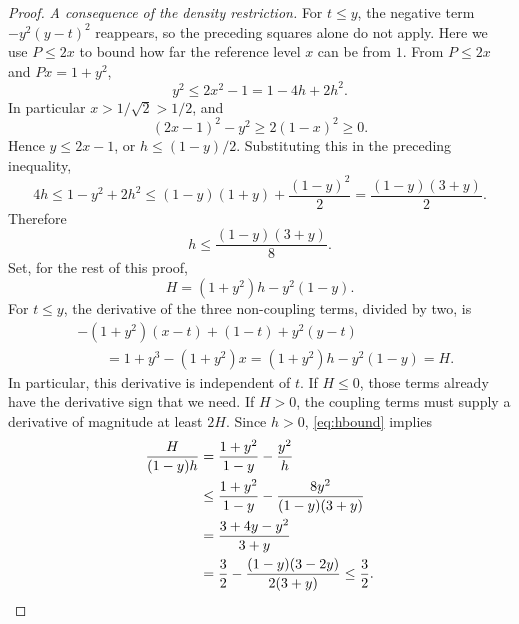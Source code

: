 \documentclass[11pt]{article}
\numberwithin{equation}{section}
\begin{document}
\begin{proof}
\smallskip
\noindent\emph{A consequence of the density restriction.}
For $t\le y$, the negative term $-y^2(y-t)^2$ reappears, so the
preceding squares alone do not apply. Here we use $P\le2x$ to
bound how far the reference level $x$ can be from $1$.
From $P\le2x$ and $Px=1+y^2$,
\[
 y^2\le2x^2-1=1-4h+2h^2.
\]
In particular $x>1/\sqrt2>1/2$, and
\[
 (2x-1)^2-y^2\ge2(1-x)^2\ge0.
\]
Hence $y\le2x-1$, or $h\le(1-y)/2$. Substituting this in the preceding inequality,
\[
 4h\le1-y^2+2h^2
 \le(1-y)(1+y)+\frac{(1-y)^2}{2}
 =\frac{(1-y)(3+y)}2.
\]
Therefore
\begin{equation}\label{eq:hbound}
 h\le\frac{(1-y)(3+y)}8.
\end{equation}
Set, for the rest of this proof,
\[
 H=(1+y^2)h-y^2(1-y).
\]
For $t\le y$, the derivative of the three non-coupling terms,
divided by two, is
\begin{align*}
 &-(1+y^2)(x-t)+(1-t)+y^2(y-t)\\
 &\qquad=1+y^3-(1+y^2)x
   =(1+y^2)h-y^2(1-y)=H.
\end{align*}
In particular, this derivative is independent of $t$.
If $H\le0$, those terms already
have the derivative sign that we need. If $H>0$, the coupling
terms must supply a derivative of magnitude at least $2H$.
Since $h>0$, \eqref{eq:hbound} implies
\begin{align}\label{eq:Hbound}
 \frac{H}{(1-y)h}
 &=\frac{1+y^2}{1-y}-\frac{y^2}{h}\notag\\
 &\le\frac{1+y^2}{1-y}
       -\frac{8y^2}{(1-y)(3+y)}\notag\\
 &=\frac{3+4y-y^2}{3+y}\notag\\
 &=\frac32-\frac{(1-y)(3-2y)}{2(3+y)}\le\frac32.
\end{align}


\end{proof}
\end{document}

